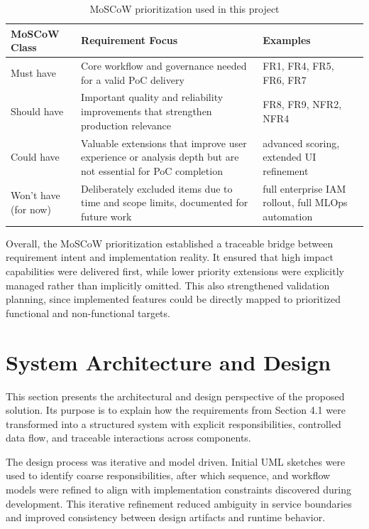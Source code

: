 \begin{table}[H]
\centering
\small
\begin{tabular}{p{2.4cm} p{8.8cm} p{3.3cm}}
\textbf{MoSCoW Class} & \textbf{Requirement Focus} & \textbf{Examples} \\
\hline
Must have & Core workflow and governance needed for a valid PoC delivery & FR1, FR4, FR5, FR6, FR7 \\
\hline
Should have & Important quality and reliability improvements that strengthen production relevance & FR8, FR9, NFR2, NFR4 \\
\hline
Could have & Valuable extensions that improve user experience or analysis depth but are not essential for PoC completion & advanced scoring, extended UI refinement \\
\hline
Won't have (for now) & Deliberately excluded items due to time and scope limits, documented for future work & full enterprise IAM rollout, full MLOps automation \\
\hline
\end{tabular}
\caption{MoSCoW prioritization used in this project}
\label{tab:moscow_prioritization}
\end{table}

Overall, the MoSCoW prioritization established a traceable bridge between requirement intent and implementation reality.
It ensured that high impact capabilities were delivered first, while lower priority extensions were explicitly managed rather than implicitly omitted.
This also strengthened validation planning, since implemented features could be directly mapped to prioritized functional and non-functional targets.




\section{System Architecture and Design}

This section presents the architectural and design perspective of the proposed solution.  
Its purpose is to explain how the requirements from Section 4.1 were transformed into a structured system with explicit responsibilities, controlled data flow, and traceable interactions across components.

\vspace{0.4cm}

The design process was iterative and model driven.  
Initial UML sketches were used to identify coarse responsibilities, after which sequence, and workflow models were refined to align with implementation constraints discovered during development.  
This iterative refinement reduced ambiguity in service boundaries and improved consistency between design artifacts and runtime behavior.

